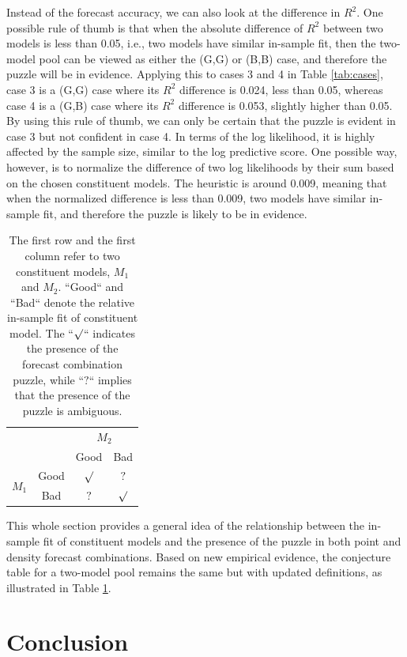 \documentclass{monashthesis}
\begin{document}
Instead of the forecast accuracy, we can also look at the difference in \(R^2\). One possible rule of thumb is that when the absolute difference of \(R^2\) between two models is less than 0.05, i.e., two models have similar in-sample fit, then the two-model pool can be viewed as either the (G,G) or (B,B) case, and therefore the puzzle will be in evidence. Applying this to cases 3 and 4 in Table \ref{tab:cases}, case 3 is a (G,G) case where its \(R^2\) difference is 0.024, less than 0.05, whereas case 4 is a (G,B) case where its \(R^2\) difference is 0.053, slightly higher than 0.05. By using this rule of thumb, we can only be certain that the puzzle is evident in case 3 but not confident in case 4. In terms of the log likelihood, it is highly affected by the sample size, similar to the log predictive score. One possible way, however, is to normalize the difference of two log likelihoods by their sum based on the chosen constituent models. The heuristic is around 0.009, meaning that when the normalized difference is less than 0.009, two models have similar in-sample fit, and therefore the puzzle is likely to be in evidence.

\begin{table}[ht]
\centering
\begin{tabular}{cccc}
                       &      & \multicolumn{2}{c}{$M_2$} \\
                       &      & Good       & Bad       \\
\multirow{2}{*}{$M_1$} & Good & $\surd$    & $?$ \\
                       & Bad  & $?$        & $\surd$
\end{tabular}
\caption{The first row and the first column refer to two constituent models, $M_1$ and $M_2$. ``Good`` and ``Bad`` denote the relative in-sample fit of constituent model. The ``$\surd$`` indicates the presence of the forecast combination puzzle, while ``$?$`` implies that the presence of the puzzle is ambiguous.}
\label{tab:2}
\end{table}

This whole section provides a general idea of the relationship between the in-sample fit of constituent models and the presence of the puzzle in both point and density forecast combinations. Based on new empirical evidence, the conjecture table for a two-model pool remains the same but with updated definitions, as illustrated in Table \ref{tab:2}.

\hypertarget{conclusion}{%
\chapter{Conclusion}\label{conclusion}}
\end{document}
